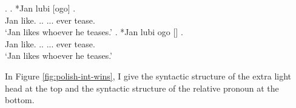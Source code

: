 \ex.\label{ex:polish-acc-dat-rep}
\ag. *Jan lubi [ogo]   .\\
Jan like.\scsub{[acc]} .. ... ever tease.\scsub{[dat]}\\
`Jan likes whoever he teases.' \label{ex:polish-acc-dat-rel}
\bg. *Jan lubi ogo []  .\\
Jan like.\scsub{[acc]} .. ... ever tease.\scsub{[dat]}\\
`Jan likes whoever he teases.' \label{ex:polish-acc-dat-lh}

In Figure \ref{fig:polish-int-wins}, I give the syntactic structure of the extra light head at the top and the syntactic structure of the relative pronoun at the bottom.

